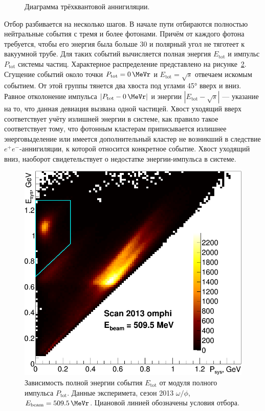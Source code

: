 \begin{figure}[htbp]
\begin{minipage}[t]{.48\textwidth}
		\caption{Диаграмма трёхквантовой аннигиляции.}\label{diag:ee_to_3g_qed}
	\end{minipage}
\end{figure}

Отбор разбивается на несколько шагов.
В начале пути отбираются полностью нейтральные события с тремя и более фотонами.
Причём от каждого фотона требуется, чтобы его энергия была больше \SI{30}{\MeVr} и полярный угол не тяготеет к вакуумной трубе.
Для таких событий вычисляется полная энергия $E_{\text{tot}}$ и импульс $P_{\text{tot}}$ системы частиц.
Характерное распределение представлено на рисунке~\ref{fig:EtvsPt5095}.
Сгущение событий около точки $P_{\text{tot}} = \SI{0}{\MeVr}$ и $E_{\text{tot}} = \sqrt{s}$ отвечаем искомым событием.
От этой группы тянется два хвоста под углами \ang{45} вверх и вниз.
Равное отколонение импульса $|P_{\text{tot}} - \SI{0}{\MeVr}|$ и энергии $|E_{\text{tot}} - \sqrt{s}|$
---
указание на то,
что данная девиация вызвана одной частицей.
Хвост уходящий вверх соответствует учёту излишней энергии в системе,
как правило такое соответствует тому,
что фотонным кластерам приписывается излишнее энерговыделение или имеется дополнительный кластер не возникший в следствие $e^+e^-$-аннигиляции,
к которой относится конкретное событие.
Хвост уходящий вниз, наоборот свидетельствует о недостатке энергии-импульса в системе.

\begin{figure}[htbp]
	\centering
	\label{fig:EtvsPt5095}
	\includegraphics[width=.5\textwidth]{img/EtvsPt5095.png}
	\caption{Зависимость полной энергии события $E_{\text{tot}}$ от модуля полного импульса $P_{\text{tot}}$.
		Данные эксперимета, сезон 2013 $\omega / \phi$, $E_{\text{beam}} = \SI{509.5}{\MeVr}$.
		Циановой линией обозначены условия отбора.}\label{fig:EtvsPt5095}
\end{figure}

